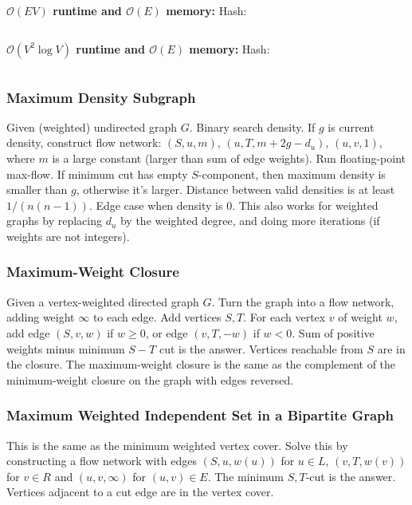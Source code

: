\documentclass[9pt,a4paper,landscape,oneside]{amsart}
\newcommand{\mintedstyle}[2]{\inputminted{#1}{code/#2}}
\newcommand{\code}[1]{ Hash: 
\mintedstyle{cpp}{#1}}
\begin{document}
\begin{multicols*}{3}
\textbf{$\mathcal{O}(EV)$ runtime and $\mathcal{O}(E)$ memory:}
\code{graphs/arborescence.cpp}

\textbf{$\mathcal{O}(V^2 \log V)$ runtime and $\mathcal{O}(E)$ memory:}
\code{graphs/arborescence-v2.cpp}


\subsubsection{Maximum Density Subgraph}
Given (weighted) undirected graph $G$. Binary search density. If $g$ is
current density, construct flow network: $(S, u, m)$, $(u, T,
m+2g-d_u)$, $(u,v,1)$, where $m$ is a large constant (larger than sum
of edge weights). Run floating-point max-flow. If minimum cut has empty
$S$-component, then maximum density is smaller than $g$, otherwise it's
larger. Distance between valid densities is at least $1/(n(n-1))$. Edge
case when density is $0$. This also works for weighted graphs by
replacing $d_u$ by the weighted degree, and doing more iterations (if
weights are not integers).

\subsubsection{Maximum-Weight Closure}
Given a vertex-weighted directed graph $G$. Turn the graph into a flow
network, adding weight $\infty$ to each edge. Add vertices $S,T$. For
each vertex $v$ of weight $w$, add edge $(S,v,w)$ if $w\geq 0$, or edge
$(v,T,-w)$ if $w<0$. Sum of positive weights minus minimum $S-T$ cut is
the answer. Vertices reachable from $S$ are in the closure. The
maximum-weight closure is the same as the complement of the
minimum-weight closure on the graph with edges reversed.

\subsubsection{Maximum Weighted Independent Set in a Bipartite Graph}
This is the same as the minimum weighted vertex cover. Solve this by
constructing a flow network with edges $(S,u,w(u))$ for $u\in L$,
$(v,T,w(v))$ for $v\in R$ and $(u,v,\infty)$ for $(u,v)\in E$. The
minimum $S,T$-cut is the answer. Vertices adjacent to a cut edge are
in the vertex cover.


\end{multicols*}
\end{document}

